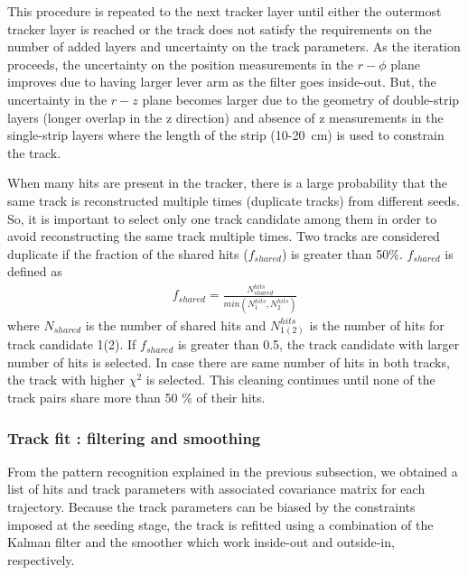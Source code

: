 This procedure is repeated to the next tracker layer until either the 
outermost tracker layer is reached or the track does not satisfy the requirements
on the number of added layers and uncertainty on the track parameters.
As the iteration proceeds, the uncertainty on the position measurements 
in the $r-\phi$ plane improves due to having larger lever arm 
as the filter goes inside-out. But, the uncertainty in the $r-z$ plane
becomes larger due to the geometry of double-strip layers
(longer overlap in the z direction) and absence of z measurements 
in the single-strip layers where the length of the strip (10-20~cm) is 
used to constrain the track. 


When many hits are present in the tracker, 
there is a large probability that the same track is reconstructed 
multiple times (duplicate tracks) from different seeds. 
So, it is important to select only one track candidate among them 
in order to avoid reconstructing the same track multiple times. 
Two tracks are considered duplicate if the fraction of the shared hits 
($f_{shared}$) is greater than 50\%.  $f_{shared}$ is defined as 
\begin{eqnarray} 
f_{shared} = \frac{N_{shared}^{hits}}{min (N_1^{hits}, N_2^{hits}) }  
\end{eqnarray}  
where $N_{shared}$ is the number of shared hits and $N_{1(2)}^{hits}$ 
is the number of hits for track candidate 1(2). If $f_{shared}$ is 
greater than 0.5, the track candidate with larger number of hits is selected. 
In case there are same number of hits in both tracks, the track with higher $\chi^2$
is selected. This cleaning continues until none of the track pairs share more than 
50 \% of their hits.  


\subsubsection{Track fit : filtering and smoothing}

From the pattern recognition explained in the previous subsection, 
we obtained a list of hits and track parameters 
with associated covariance matrix for each trajectory. 
Because the track parameters can be biased 
by the constraints imposed at the seeding stage, the track is refitted 
using a combination of the Kalman filter and the smoother
which work inside-out and outside-in, respectively. 

